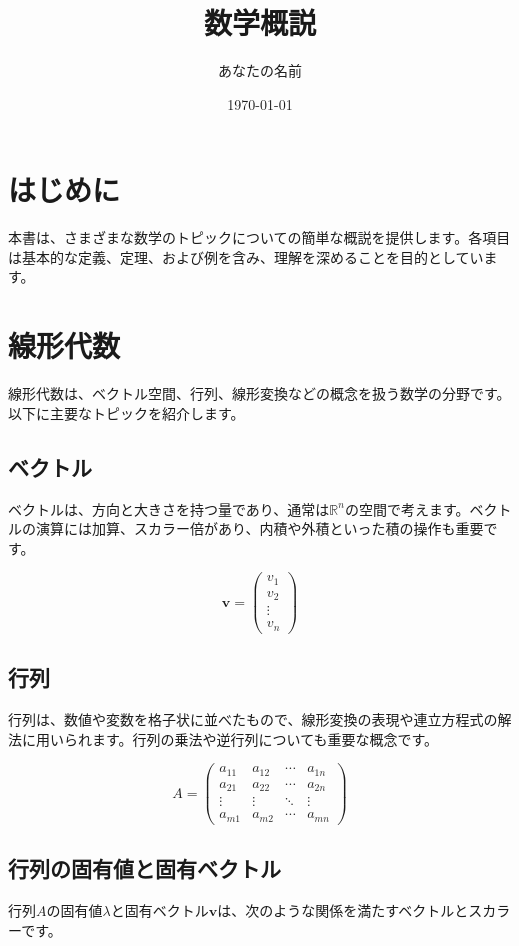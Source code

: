 \documentclass{article}
\title{数学概説}
\author{あなたの名前}
\date{\today}
\begin{document}
\maketitle

\section*{はじめに}
本書は、さまざまな数学のトピックについての簡単な概説を提供します。各項目は基本的な定義、定理、および例を含み、理解を深めることを目的としています。

\section{線形代数}
線形代数は、ベクトル空間、行列、線形変換などの概念を扱う数学の分野です。以下に主要なトピックを紹介します。

\subsection{ベクトル}
ベクトルは、方向と大きさを持つ量であり、通常は$\mathbb{R}^n$の空間で考えます。ベクトルの演算には加算、スカラー倍があり、内積や外積といった積の操作も重要です。

\[
\mathbf{v} = \begin{pmatrix} v_1 \\ v_2 \\ \vdots \\ v_n \end{pmatrix}
\]

\subsection{行列}
行列は、数値や変数を格子状に並べたもので、線形変換の表現や連立方程式の解法に用いられます。行列の乗法や逆行列についても重要な概念です。

\[
A = \begin{pmatrix}
a_{11} & a_{12} & \cdots & a_{1n} \\
a_{21} & a_{22} & \cdots & a_{2n} \\
\vdots & \vdots & \ddots & \vdots \\
a_{m1} & a_{m2} & \cdots & a_{mn}
\end{pmatrix}
\]

\subsection{行列の固有値と固有ベクトル}
行列$A$の固有値$\lambda$と固有ベクトル$\mathbf{v}$は、次のような関係を満たすベクトルとスカラーです。
\end{document}

